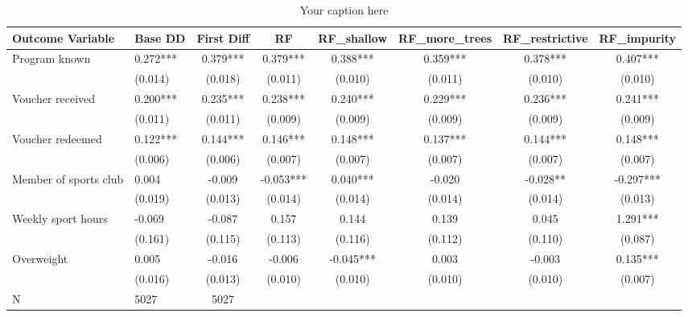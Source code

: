 \begin{sidewaystable*}
\centering
\begin{tabular}{llcccccc}
\hline
Outcome Variable & Base DD & First Diff & RF & RF_shallow & RF_more_trees & RF_restrictive & RF_impurity \\
\hline
Program known & 0.272*** & 0.379*** & 0.379*** & 0.388*** & 0.359*** & 0.378*** & 0.407*** \\
  & (0.014) & (0.018) & (0.011) & (0.010) & (0.011) & (0.010) & (0.010) \\
Voucher received & 0.200*** & 0.235*** & 0.238*** & 0.240*** & 0.229*** & 0.236*** & 0.241*** \\
  & (0.011) & (0.011) & (0.009) & (0.009) & (0.009) & (0.009) & (0.009) \\
Voucher redeemed & 0.122*** & 0.144*** & 0.146*** & 0.148*** & 0.137*** & 0.144*** & 0.148*** \\
  & (0.006) & (0.006) & (0.007) & (0.007) & (0.007) & (0.007) & (0.007) \\
Member of sports club & 0.004 & -0.009 & -0.053*** & 0.040*** & -0.020 & -0.028** & -0.297*** \\
  & (0.019) & (0.013) & (0.014) & (0.014) & (0.014) & (0.014) & (0.013) \\
Weekly sport hours & -0.069 & -0.087 & 0.157 & 0.144 & 0.139 & 0.045 & 1.291*** \\
  & (0.161) & (0.115) & (0.113) & (0.116) & (0.112) & (0.110) & (0.087) \\
Overweight & 0.005 & -0.016 & -0.006 & -0.045*** & 0.003 & -0.003 & 0.135*** \\
  & (0.016) & (0.013) & (0.010) & (0.010) & (0.010) & (0.010) & (0.007) \\
\hline
N & 5027 & 5027  &  &  &  &  \\
\hline
\end{tabular}
\caption{Your caption here}
\label{tab:your_label}
\end{sidewaystable*}